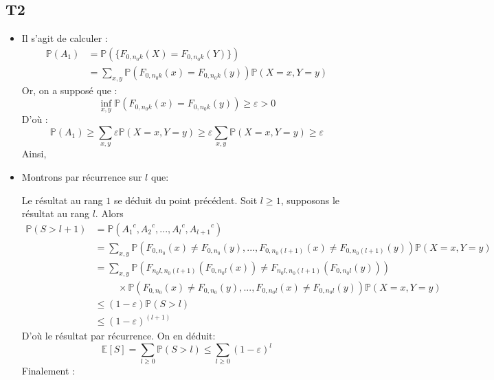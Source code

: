 \documentclass[a4paper,11pt]{article}
\begin{document}
\subsection*{T2}
\begin{itemize}

\item[\textbullet]
Il s'agit de calculer :
\begin{equation*}
\begin{split}
\mathbb{P}(A_1)&=\mathbb{P}(\{F_{0,{n_0}k}(X)=F_{0,{n_0}k}(Y)\})\\
&=\sum_{x,y} \mathbb{P}(F_{0,{n_0}k}(x)=F_{0,{n_0}k}(y))\mathbb{P}(X=x,Y=y)
\end{split}
\end{equation*}
Or, on a supposé que :
\[\inf_{x,y}\mathbb{P}(F_{0,{n_0}k}(x)=F_{0,{n_0}k}(y))\geq\varepsilon>0\]
D'où :
\[ \mathbb{P}(A_1)\geq\sum_{x,y} \varepsilon\mathbb{P}(X=x,Y=y)\geq\varepsilon\sum_{x,y}\mathbb{P}(X=x,Y=y)\geq\varepsilon\]
Ainsi,
\begin{center}
\end{center}

\item[\textbullet]
Montrons par récurrence sur $l$ que:
\begin{center}
\end{center}
Le résultat au rang $1$ se déduit du point précédent.
Soit $l\geq1$, supposons le résultat au rang $l$. Alors
\begin{equation*}
\begin{split}
\mathbb{P}(S>l+1)&=\mathbb{P}({A_1}^c,{A_2}^c,...,{A_l}^c,{A_{l+1}}^c)\\
&=\sum_{x,y} \mathbb{P}(F_{0,n_0}(x)\neq F_{0,n_0}(y),...,F_{0,{n_0}(l+1)}(x)\neq F_{0,{n_0}(l+1)}(y))\mathbb{P}(X=x,Y=y)\\
&=\sum_{x,y} \mathbb{P}(F_{n_0l,n_0(l+1)}(F_{0,{n_0}l}(x))\neq F_{n_0l,n_0(l+1)}(F_{0,{n_0}l}(y))) \\
&\hspace{1cm}\times\mathbb{P}(F_{0,n_0}(x)\neq F_{0,n_0}(y),...,F_{0,{n_0}l}(x)\neq F_{0,{n_0}l}(y))\mathbb{P}(X=x,Y=y)\\
&\leq (1-\varepsilon)\mathbb{P}(S>l)\\
&\leq (1-\varepsilon)^{(l+1)}
\end{split}
\end{equation*}
D'où le résultat par récurrence.
On en déduit:
\[\mathbb{E}[S]=\sum_{l\geq0}\mathbb{P}(S>l)\leq\sum_{l\geq0}(1-\varepsilon)^l\]
Finalement :


\end{itemize}
\end{document}
